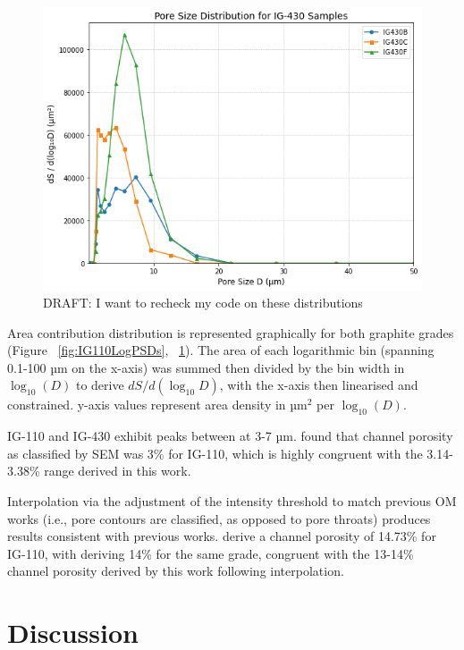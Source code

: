 \documentclass[review]{elsarticle}
\begin{document}
\begin{figure}
    \centering
    \includegraphics[width=0.9\columnwidth]{./Media/IG430 ds LogD .png}
    \caption{DRAFT: I want to recheck my code on these distributions}
    \label{fig:IG430LogPSDs}
\end{figure}

Area contribution distribution is represented graphically for both graphite
grades (Figure ~\ref{fig:IG110LogPSDs}, ~\ref{fig:IG430LogPSDs}). The area of
each logarithmic bin (spanning 0.1-100 µm on the x-axis) was summed then divided
by the bin width in \(\log_{10}(D)\) to derive \(dS/d(\log_{10}D)\), with the
x-axis then linearised and constrained. y-axis values represent area density in
µm\(^2\) per \(\log_{10}(D)\).

IG-110 and IG-430 exhibit peaks between at 3-7 µm. \citep{huang2021statistical}
found that channel porosity as classified by SEM was 3\% for IG-110, which is
highly congruent with the 3.14-3.38\% range derived in this work.

Interpolation via the adjustment of the intensity threshold to match previous OM
works (i.e., pore contours are classified, as opposed to pore throats) produces
results consistent with previous works. \citep{Kane2011a} derive a channel
porosity of 14.73\% for IG-110, with \citep{Huang2019} deriving 14\% for the
same grade, congruent with the 13-14\% channel porosity derived by this work
following interpolation.

\section{Discussion}
\end{document}
